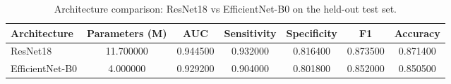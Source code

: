 \begin{table}
\caption{Architecture comparison: ResNet18 vs EfficientNet-B0 on the held-out test set.}
\label{tab:arch_comparison}
\begin{tabular}{lcccccc}
\toprule
Architecture & Parameters (M) & AUC & Sensitivity & Specificity & F1 & Accuracy \\
\midrule
ResNet18 & 11.700000 & 0.944500 & 0.932000 & 0.816400 & 0.873500 & 0.871400 \\
EfficientNet-B0 & 4.000000 & 0.929200 & 0.904000 & 0.801800 & 0.852000 & 0.850500 \\
\bottomrule
\end{tabular}
\end{table}
